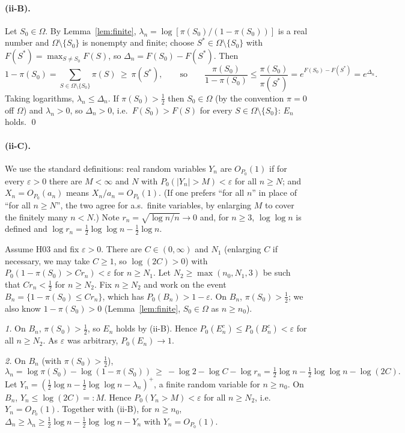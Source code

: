 \documentclass[11pt]{article}
\theoremstyle{remark}
\begin{document}
\paragraph{(ii-B).}
Let $S_0\in\Omega$. By Lemma~\ref{lem:finite}, $\lambda_n=\log[\pi(S_0)/(1-\pi(S_0))]$ is a real number and $\Omega\setminus\{S_0\}$ is nonempty and finite; choose $S^*\in\Omega\setminus\{S_0\}$ with $F(S^*)=\max_{S\ne S_0}F(S)$, so $\Delta_n=F(S_0)-F(S^*)$. Then
\[
1-\pi(S_0)=\sum_{S\in\Omega\setminus\{S_0\}}\pi(S)\ \ge\ \pi(S^*),\qquad\text{so}\qquad
\frac{\pi(S_0)}{1-\pi(S_0)}\le\frac{\pi(S_0)}{\pi(S^*)}=e^{F(S_0)-F(S^*)}=e^{\Delta_n}.
\]
Taking logarithms, $\lambda_n\le\Delta_n$. If $\pi(S_0)>\frac12$ then $S_0\in\Omega$ (by the convention $\pi=0$ off $\Omega$) and $\lambda_n>0$, so $\Delta_n>0$, i.e.\ $F(S_0)>F(S)$ for every $S\in\Omega\setminus\{S_0\}$: $E_n$ holds. \qed

\paragraph{(ii-C).}
We use the standard definitions: real random variables $Y_n$ are $O_{P_0}(1)$ if for every $\varepsilon>0$ there are $M<\infty$ and $N$ with $P_0(|Y_n|>M)<\varepsilon$ for all $n\ge N$; and $X_n=O_{P_0}(a_n)$ means $X_n/a_n=O_{P_0}(1)$. (If one prefers ``for all $n$'' in place of ``for all $n\ge N$'', the two agree for a.s.\ finite variables, by enlarging $M$ to cover the finitely many $n<N$.) Note $r_n=\sqrt{\log n/n}\to0$ and, for $n\ge3$, $\log\log n$ is defined and $\log r_n=\tfrac12\log\log n-\tfrac12\log n$.

Assume H03 and fix $\varepsilon>0$. There are $C\in(0,\infty)$ and $N_1$ (enlarging $C$ if necessary, we may take $C\ge1$, so $\log(2C)>0$) with $P_0(1-\pi(S_0)>Cr_n)<\varepsilon$ for $n\ge N_1$. Let $N_2\ge\max(n_0,N_1,3)$ be such that $Cr_n<\frac12$ for $n\ge N_2$. Fix $n\ge N_2$ and work on the event $B_n=\{1-\pi(S_0)\le Cr_n\}$, which has $P_0(B_n)>1-\varepsilon$. On $B_n$, $\pi(S_0)>\frac12$; we also know $1-\pi(S_0)>0$ (Lemma~\ref{lem:finite}, $S_0\in\Omega$ as $n\ge n_0$).

\emph{1.} On $B_n$, $\pi(S_0)>\frac12$, so $E_n$ holds by (ii-B). Hence $P_0(E_n^c)\le P_0(B_n^c)<\varepsilon$ for all $n\ge N_2$. As $\varepsilon$ was arbitrary, $P_0(E_n)\to1$.

\emph{2.} On $B_n$ (with $\pi(S_0)>\frac12$),
\[
\lambda_n=\log\pi(S_0)-\log(1-\pi(S_0))\ \ge\ -\log2-\log C-\log r_n=\tfrac12\log n-\tfrac12\log\log n-\log(2C).
\]
Let $Y_n=(\tfrac12\log n-\tfrac12\log\log n-\lambda_n)^+$, a finite random variable for $n\ge n_0$. On $B_n$, $Y_n\le\log(2C)=:M$. Hence $P_0(Y_n>M)<\varepsilon$ for all $n\ge N_2$, i.e.\ $Y_n=O_{P_0}(1)$. Together with (ii-B), for $n\ge n_0$,
$\Delta_n\ge\lambda_n\ge\tfrac12\log n-\tfrac12\log\log n-Y_n$ with $Y_n=O_{P_0}(1)$.
\end{document}
